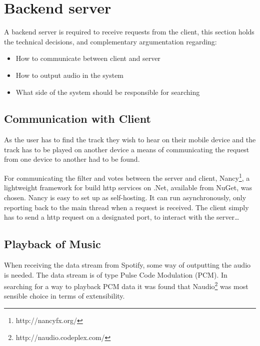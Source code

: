 \section{Backend server}

A backend server is required to receive requests from the client, this section holds the technical decisions, and complementary argumentation regarding:
\begin{itemize}
  \item How to communicate between client and server
  \item How to output audio in the system
  \item What side of the system should be responsible for searching
\end{itemize}

\subsection{Communication with Client}
As the user has to find the track they wish to hear on their mobile device and the track has to be played on another device a means of communicating the request from one device to another had to be found.

For communicating the filter and votes between the server and client, Nancy\footnote{http://nancyfx.org/}, a lightweight framework for build http services on .Net, available from NuGet, was chosen. Nancy is easy to set up as self-hosting. It can run asynchronously, only reporting back to the main thread when a request is received. The client simply has to send a http request on a designated port, to interact with the server\dots {}

\subsection{Playback of Music}
When receiving the data stream from Spotify, some way of outputting the audio is needed. The data stream is of type Pulse Code Modulation (PCM). In searching for a way to playback PCM data it was found that Naudio\footnote{http://naudio.codeplex.com/} was most sensible choice in terms of extensibility.

